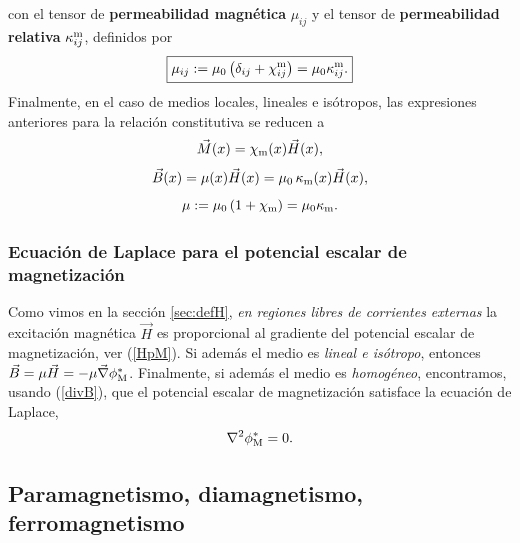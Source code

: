 con el tensor de \textbf{permeabilidad magnética} $\mu_{ij}$ y el
tensor de \textbf{permeabilidad relativa} $\kappa^{\rm m}_{ij}$, definidos por
\begin{equation}
 \boxed{\mu_{ij}:=\mu_0\left(\delta_{ij}+\chi^{\rm
m}_{ij}\right)=\mu_0\kappa^{\rm m}_{ij}.}
\end{equation}
Finalmente, en el caso de medios locales, lineales e isótropos, las
expresiones anteriores para la relación constitutiva se reducen a
\begin{equation}
 \vec{M}(x)=\chi_{\rm m}(x)\vec{H}(x),
\end{equation}
\begin{equation}
 \vec{B}(x)=\mu(x)\vec{H}(x)=\mu_0\,\kappa_{\rm m}(x)\vec{H}(x),
\end{equation}
\begin{equation}
 \mu:=\mu_0\left(1+\chi_{\rm m}\right)=\mu_0\kappa_{\rm m}.
\end{equation}


\subsubsection{Ecuación de Laplace para el potencial escalar de magnetización}
Como vimos en la sección \ref{sec:defH}, \textit{en regiones libres de corrientes externas} la excitación magnética $\vec{H}$ es proporcional al gradiente del potencial escalar de magnetización, ver (\ref{HpM}). Si además el medio es \textit{lineal e isótropo}, entonces $\vec{B}=\mu\vec{H}=-\mu\vec{\nabla}\phi^\ast_{\rm M}$. Finalmente, si además el medio es \textit{homogéneo}, encontramos, usando (\ref{divB}), que el potencial escalar de magnetización satisface la ecuación de Laplace,
\begin{equation}
\nabla^2\phi^\ast_{\rm M}=0.
\end{equation}


\subsection{Paramagnetismo, diamagnetismo, ferromagnetismo}

